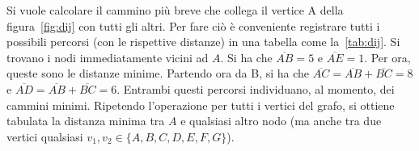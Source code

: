 Si vuole calcolare il cammino più breve che collega il vertice A della figura~\ref{fig:dij} con tutti gli altri. Per fare ciò è conveniente registrare tutti i possibili percorsi (con le rispettive distanze) in una tabella come la~\ref{tab:dij}. Si trovano i nodi immediatamente vicini ad $A$. Si ha che $\overline{AB}=5$ e $\overline{AE}=1$. Per ora, queste sono le distanze minime. Partendo ora da B, si ha che $\overline{AC}=\overline{AB}+\overline{BC}=8$ e $\overline{AD}=\overline{AB}+\overline{BC}=6$. Entrambi questi percorsi individuano, al momento, dei cammini minimi. Ripetendo l'operazione per tutti i vertici del grafo, si ottiene tabulata la distanza minima tra $A$ e qualsiasi altro nodo (ma anche tra due vertici qualsiasi $v_1,v_2\in\{A, B, C, D, E, F, G\}$).
\begin{figure}
	\centering
		\\
	\quad
	\\

\end{figure}

